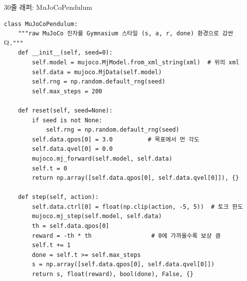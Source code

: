 \begin{frame}[fragile]{30줄 래퍼: MuJoCoPendulum}
\begin{lstlisting}
class MuJoCoPendulum:
    """raw MuJoCo 진자를 Gymnasium 스타일 (s, a, r, done) 환경으로 감싼다."""
    def __init__(self, seed=0):
        self.model = mujoco.MjModel.from_xml_string(xml)  # 위의 xml
        self.data = mujoco.MjData(self.model)
        self.rng = np.random.default_rng(seed)
        self.max_steps = 200

    def reset(self, seed=None):
        if seed is not None:
            self.rng = np.random.default_rng(seed)
        self.data.qpos[0] = 3.0          # 목표에서 먼 각도
        self.data.qvel[0] = 0.0
        mujoco.mj_forward(self.model, self.data)
        self.t = 0
        return np.array([self.data.qpos[0], self.data.qvel[0]]), {}

    def step(self, action):
        self.data.ctrl[0] = float(np.clip(action, -5, 5))  # 토크 한도
        mujoco.mj_step(self.model, self.data)
        th = self.data.qpos[0]
        reward = -th * th                 # 0에 가까울수록 보상 큼
        self.t += 1
        done = self.t >= self.max_steps
        s = np.array([self.data.qpos[0], self.data.qvel[0]])
        return s, float(reward), bool(done), False, {}
\end{lstlisting}
\end{frame}
